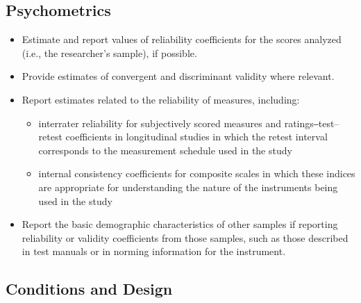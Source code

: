 \documentclass[acmsmall]{acmart}
\begin{document}
\subsection{Psychometrics}
\begin{itemize}
    \item Estimate and report values of reliability coefficients for the scores analyzed (i.e., the researcher’s sample), if possible. 
    \item Provide estimates of convergent and discriminant validity where relevant.
    \item Report estimates related to the reliability of measures, including: 
    \begin{itemize}
        \item interrater reliability for subjectively scored measures and ratings‒test–retest coefficients in longitudinal studies in which the retest interval corresponds to the measurement schedule used in the study
        \item internal consistency coefficients for composite scales in which these indices are appropriate for understanding the nature of the instruments being used in the study
    \end{itemize}
    \item Report the basic demographic characteristics of other samples if reporting reliability or validity coefficients from those samples, such as those described in test manuals or in norming information for the instrument.
\end{itemize}

\subsection{Conditions and Design}
\end{document}
